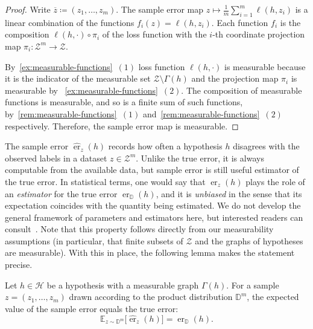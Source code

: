 \begin{proof}

    Write $\overline{z} \coloneqq (z_1, \dots, z_m)$. The sample error map $z \mapsto \frac{1}{m}\sum_{i=1}^m \ell(h,z_i)$ is a linear combination of the functions $f_i(z) = \ell(h,z_i)$. Each function $f_i$ is the composition $\ell(h, \cdot) \circ \pi_i$ of the loss function with the $i$-th coordinate projection map $\pi_i: \mathcal{Z}^m \to \mathcal{Z}$.

    By~\ref{ex:measurable-functions}~$(1)$ loss function $\ell(h, \cdot)$ is measurable because it is the indicator of the measurable set $\mathcal{Z}\setminus\Gamma(h)$ and the projection map $\pi_i$ is measurable by ~\ref{ex:measurable-functions}~$(2)$. The composition of measurable functions is measurable, and so is a finite sum of such functions, by~\ref{rem:measurable-functions}~$(1)$ and~\ref{rem:measurable-functions}~$(2)$ respectively. Therefore, the sample error map is measurable.
    \qedhere
\end{proof}

The sample error $\hat{\operatorname{er}}_z(h)$ records how often a hypothesis $h$ disagrees with the observed labels in a dataset $z \in \mathcal{Z}^m$. Unlike the true error, it is always computable from the available data, but sample error is still useful estimator of the true error. In statistical terms, one would say that $\hat{\operatorname{er}}_z(h)$ plays the role of an \emph{estimator} for the true error $\operatorname{er}_{\mathbb{D}}(h)$, and it is \emph{unbiased} in the sense that its expectation coincides with the quantity being estimated. We do not develop the general framework of parameters and estimators here, but interested readers can consult~\cite[\S 8.4]{ProbabilityAndStatisticsDeGroot}. Note that this property follows directly from our measurability assumptions (in particular, that finite subsets of $\mathcal{Z}$ and the graphs of hypotheses are measurable). With this in place, the following lemma makes the statement precise.

\begin{lemma}
    \label{lem:sample-error-unbiased}
    Let $h \in \mathcal{H}$ be a hypothesis with a measurable graph $\Gamma(h)$. For a sample $z = (z_1, \dots, z_m)$ drawn according to the product distribution $\mathbb{D}^m$, the expected value of the sample error equals the true error:
    \[
        \mathbb{E}_{z\sim\mathbb{D}^m}\bigl[\hat{\operatorname{er}}_{z}(h)\bigr] = \operatorname{er}_{\mathbb{D}}(h).
    \]
\end{lemma}

